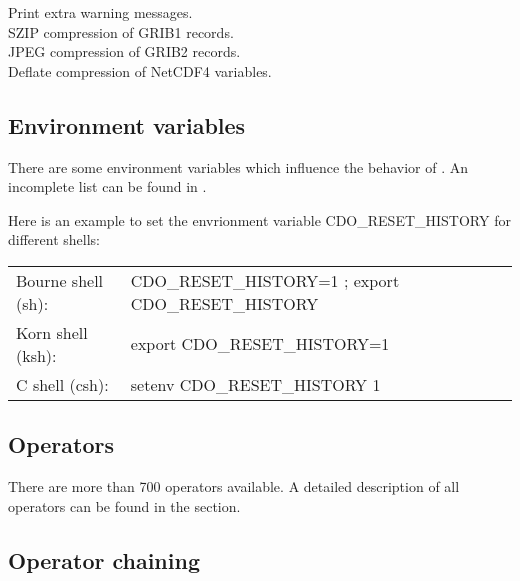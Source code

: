 \begin{tabbing}
         \> Print extra warning messages. \\
         \> SZIP compression of GRIB1 records. \\
         \> JPEG compression of GRIB2 records. \\
         \> Deflate compression of NetCDF4 variables. \\
\end{tabbing}

\subsection{Environment variables}

There are some environment variables which influence the behavior of {\CDO}. 
An incomplete list can be found in .

Here is an example to set the envrionment variable CDO\_RESET\_HISTORY for different shells:

\begin{tabular}[b]{ll}
Bourne shell (sh): & CDO\_RESET\_HISTORY=1 ; export CDO\_RESET\_HISTORY \\
Korn shell (ksh):   & export CDO\_RESET\_HISTORY=1 \\
C shell (csh):        & setenv CDO\_RESET\_HISTORY 1 \\
\end{tabular}


\subsection{Operators}

There are more than 700 operators available.
A detailed description of all operators can be found in the
\textbf{} section.


\subsection{Operator chaining}

